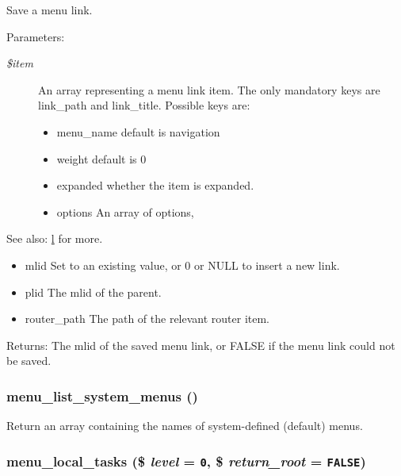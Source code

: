 Save a menu link.

\begin{Desc}
\item[Parameters:]
\begin{description}
\item[{\em \$item}]An array representing a menu link item. The only mandatory keys are link\_\-path and link\_\-title. Possible keys are:\begin{itemize}
\item menu\_\-name default is navigation\item weight default is 0\item expanded whether the item is expanded.\item options An array of options, \end{itemize}
\end{description}
\end{Desc}
\begin{Desc}
\item[See also:]\hyperlink{common_8inc_b1b47d5ab720066df684c335eda75cfd}{l} for more.\begin{itemize}
\item mlid Set to an existing value, or 0 or NULL to insert a new link.\item plid The mlid of the parent.\item router\_\-path The path of the relevant router item. \end{itemize}
\end{Desc}
\begin{Desc}
\item[Returns:]The mlid of the saved menu link, or FALSE if the menu link could not be saved. \end{Desc}
\hypertarget{group__menu_g28e765ff428a3f18978af564ee0147d6}{
\subsubsection[{menu\_\-list\_\-system\_\-menus}]{\setlength{\rightskip}{0pt plus 5cm}menu\_\-list\_\-system\_\-menus ()}}
\label{group__menu_g28e765ff428a3f18978af564ee0147d6}


Return an array containing the names of system-defined (default) menus. \hypertarget{group__menu_g6641ad95c6f964fbdc3f594d86696569}{
\subsubsection[{menu\_\-local\_\-tasks}]{\setlength{\rightskip}{0pt plus 5cm}menu\_\-local\_\-tasks (\$ {\em level} = {\tt 0}, \/  \$ {\em return\_\-root} = {\tt FALSE})}}
\label{group__menu_g6641ad95c6f964fbdc3f594d86696569}


